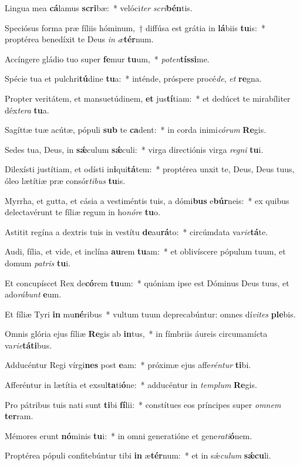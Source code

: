 \item Lingua mea \textbf{cá}lamus \textbf{scri}bæ:~* velóci\textit{ter} \textit{scri}\textbf{bén}tis.
\item Speciósus forma præ fíliis hóminum,~† diffúsa est grátia in \textbf{lá}biis \textbf{tu}is:~* proptérea benedíxit te Deus \textit{in} \textit{æ}\textbf{tér}num.
\item Accíngere gládio tuo super \textbf{fe}mur \textbf{tu}um,~* \textit{pot}\textit{en}\textbf{tís}\textbf{si}me.
\item Spécie tua et pulchri\textbf{tú}dine \textbf{tu}a:~* inténde, próspere procé\textit{de}, \textit{et} \textbf{re}gna.
\item Propter veritátem, et mansuetúdinem, \textbf{et} jus\textbf{tí}tiam:~* et dedúcet te mirabíliter déx\textit{te}\textit{ra} \textbf{tu}a.
\item Sagíttæ tuæ acútæ, pópuli \textbf{sub} te \textbf{ca}dent:~* in corda inimi\textit{có}\textit{rum} \textbf{Re}gis.
\item Sedes tua, Deus, in \textbf{sǽ}culum \textbf{sǽ}culi:~* virga directiónis virga \textit{re}\textit{gni} \textbf{tu}i.
\item Dilexísti justítiam, et odísti in\textbf{i}qui\textbf{tá}tem:~* proptérea unxit te, Deus, Deus tuus, óleo lætítiæ præ consór\textit{ti}\textit{bus} \textbf{tu}is.
\item Myrrha, et gutta, et cásia a vestiméntis tuis, a dómi\textbf{bus} e\textbf{búr}neis:~* ex quibus delectavérunt te fíliæ regum in ho\textit{nó}\textit{re} \textbf{tu}o.
\item Astitit regína a dextris tuis in vestítu \textbf{de}au\textbf{rá}to:~* circúmdata va\textit{ri}\textit{e}\textbf{tá}te.
\item Audi, fília, et vide, et inclína \textbf{au}rem \textbf{tu}am:~* et oblivíscere pópulum tuum, et domum \textit{pa}\textit{tris} \textbf{tu}i.
\item Et concupíscet Rex de\textbf{có}rem \textbf{tu}um:~* quóniam ipse est Dóminus Deus tuus, et ado\textit{rá}\textit{bunt} \textbf{e}um.
\item Et fíliæ Tyri \textbf{in} mu\textbf{né}ribus~* vultum tuum deprecabúntur: omnes dí\textit{vi}\textit{tes} \textbf{ple}bis.
\item Omnis glória ejus fíliæ \textbf{Re}gis ab \textbf{in}tus,~* in fímbriis áureis circumamícta va\textit{ri}\textit{e}\textbf{tá}\textbf{ti}bus.
\item Adducéntur Regi vírgi\textbf{nes} post \textbf{e}am:~* próximæ ejus affe\textit{rén}\textit{tur} \textbf{ti}bi.
\item Afferéntur in lætítia et exsul\textbf{ta}ti\textbf{ó}ne:~* adducéntur in \textit{tem}\textit{plum} \textbf{Re}gis.
\item Pro pátribus tuis nati sunt \textbf{ti}bi \textbf{fí}lii:~* constítues eos príncipes super \textit{om}\textit{nem} \textbf{ter}ram.
\item Mémores erunt \textbf{nó}minis \textbf{tu}i:~* in omni generatióne et gene\textit{ra}\textit{ti}\textbf{ó}nem.
\item Proptérea pópuli confitebúntur tibi \textbf{in} æ\textbf{tér}num:~* et in sǽ\textit{cu}\textit{lum} \textbf{sǽ}\textbf{cu}li.
